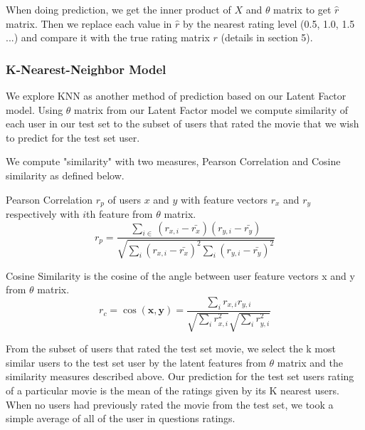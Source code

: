 \documentclass[10pt]{article}
\begin{document}
When doing prediction, we get the inner product of $X$ and $\theta$ matrix to get $\hat{r}$ matrix. Then we replace each value in $\hat{r}$ by the nearest rating level (0.5, 1.0, 1.5 ...) and compare it with the true rating matrix $r$ (details in section 5).

\subsubsection{K-Nearest-Neighbor Model}
We explore KNN as another method of prediction based on our Latent Factor model. Using $\theta$ matrix from our Latent Factor model we compute similarity of each user in our test set to the subset of users that rated the movie that we wish to predict for the test set user.  

We compute "similarity" with two measures, Pearson Correlation and Cosine similarity as defined below.

Pearson Correlation $r_{p}$ of users $x$ and $y$ with feature vectors $r_{x}$ and $r_{y}$ respectively with $i$th feature from $\theta$ matrix.  
$$r_{p} = \dfrac{ \sum_{i\in} (r_{x,i} - \bar{r_{x}})(r_{y,i} - \bar{r_{y}})}{\sqrt{\sum_{i} (r_{x,i} - \bar{r_{x}})^{2} \sum_{i} (r_{y,i} - \bar{r_{y}})^{2}}}$$ 

Cosine Similarity is the cosine of the angle between user feature vectors x and y from $\theta$ matrix.
$$r_{c} = \cos(\textbf{x},\textbf{y}) = \frac{\sum_{i} r_{x,i} r_{y,i} }{\sqrt{\sum_{i} r_{x,i}^2} \sqrt{\sum_{i} r_{y,i}^2}} $$

From the subset of users that rated the test set movie, we select the k most similar users to the test set user by the latent features from $\theta$ matrix and the similarity measures described above. Our prediction for the test set users rating of a particular movie is the mean of the ratings given by its K nearest users. When no users had previously rated the movie from the test set, we took a simple average of all of the user in questions ratings. 
\end{document}
